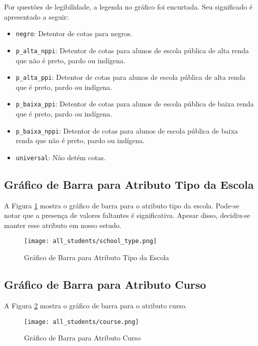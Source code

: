 Por questões de legibilidade, a legenda no gráfico foi encurtada. Seu significado é
apresentado a seguir: 
\begin{itemize}
    \item \texttt{negro}: Detentor de cotas para negros.
    \item \texttt{p\_alta\_nppi}: Detentor de cotas para alunos de escola pública de
        alta renda que não é preto, pardo ou indígena.
    \item \texttt{p\_alta\_ppi}: Detentor de cotas para alunos de escola pública de
        alta renda que é preto, pardo ou indígena.
    \item \texttt{p\_baixa\_ppi}: Detentor de cotas para alunos de escola pública de
        baixa renda que é preto, pardo ou indígena.
    \item \texttt{p\_baixa\_nppi}: Detentor de cotas para alunos de escola pública de
        baixa renda que não é preto, pardo ou indígena.
    \item \texttt{universal}: Não detém cotas.
\end{itemize}

\subsection{Gráfico de Barra para Atributo Tipo da Escola}
A Figura \ref{atr_school} mostra o gráfico de barra para o atributo tipo da escola.
Pode-se notar que a presença de valores faltantes é significativa. Apesar disso,
decidiu-se manter esse atributo em nosso estudo. 
\begin{figure}[!ht]
    \caption{Gráfico de Barra para Atributo Tipo da Escola}
    \centering
    \texttt{[image: all\_students/school\_type.png]}
    \label{atr_school}
\end{figure}

\subsection{Gráfico de Barra para Atributo Curso}
A Figura \ref{atr_course} mostra o gráfico de barra para o atributo curso. 

\begin{figure}[!ht]
    \caption{Gráfico de Barra para Atributo Curso}
    \centering
    \texttt{[image: all\_students/course.png]}
    \label{atr_course}
\end{figure}

